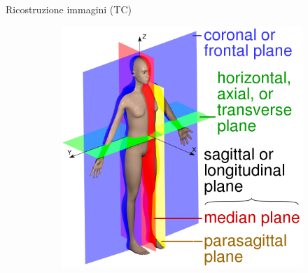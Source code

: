 \documentclass{beamer}
\begin{document}
\begin{frame}{Ricostruzione immagini (TC)}
\begin{figure}
\begin{subfigure}{.4\textwidth}
  			\includegraphics[width=1\linewidth]{Images/anatomyplanes.png}
		\end{subfigure}
	\end{figure}
	
	\end{frame}
	
	
\end{document}
